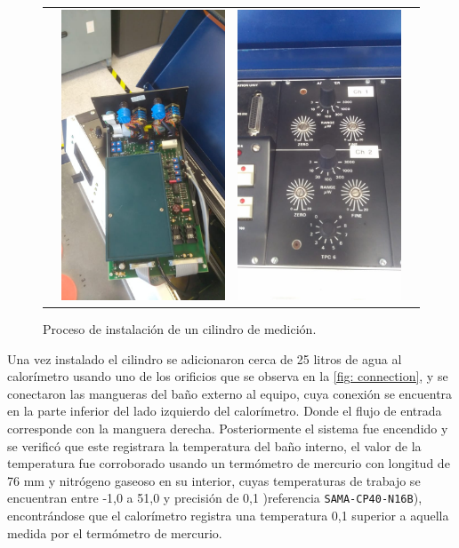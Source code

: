 \begin{figure}[h]
\begin{tabular}{cccc}
			& 
			\includegraphics[width=0.24\linewidth]{Figures/process/p3} &
			\includegraphics[width=0.24\linewidth]{Figures/process/p4} &
		\end{tabular}
		\caption{Proceso de instalación de un cilindro de medición.}
		\label{fig: instalationMultiple}
	\end{figure}

	Una vez instalado el cilindro se adicionaron cerca de 25 litros de agua al calor\'imetro usando uno de los orificios que se observa en la \autoref{fig: connection}, y se conectaron las mangueras del baño externo al equipo, cuya conexión se encuentra en la parte inferior del lado izquierdo del calorímetro. Donde el flujo de entrada corresponde con la manguera derecha. Posteriormente el sistema fue encendido y se verific\'o que este registrara la temperatura del ba\~no interno, el valor de la temperatura fue corroborado usando un term\'ometro de mercurio con longitud de 76 mm y nitr\'ogeno gaseoso en su interior, cuyas temperaturas de trabajo se encuentran entre -1,0 \grad{} a 51,0 \grad{} y precisión de 0,1 \grad{} )referencia \texttt{SAMA-CP40-N16B}), encontr\'andose que el calor\'imetro registra una temperatura 0,1 \grad{} superior a aquella medida por el term\'ometro de mercurio.
	
